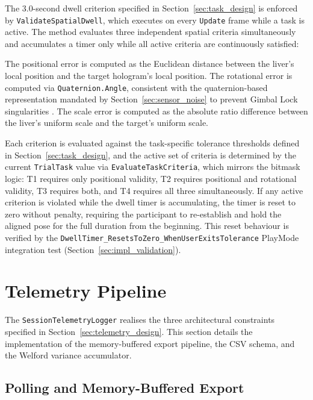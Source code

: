 The 3.0-second dwell criterion specified in Section~\ref{sec:task_design} is enforced by \texttt{ValidateSpatialDwell}, which executes on every \texttt{Update} frame while a task is active. The method evaluates three independent spatial criteria simultaneously and accumulates a timer only while all active criteria are continuously satisfied:

The positional error is computed as the Euclidean distance between the liver's local position and the target hologram's local position. The rotational error is computed via \texttt{Quaternion.Angle}, consistent with the quaternion-based representation mandated by Section~\ref{sec:sensor_noise} to prevent Gimbal Lock singularities \citep{Fang1998RealQuaternions}. The scale error is computed as the absolute ratio difference between the liver's uniform scale and the target's uniform scale.

Each criterion is evaluated against the task-specific tolerance thresholds defined in Section~\ref{sec:task_design}, and the active set of criteria is determined by the current \texttt{TrialTask} value via \texttt{EvaluateTaskCriteria}, which mirrors the bitmask logic: T1 requires only positional validity, T2 requires positional and rotational validity, T3 requires both, and T4 requires all three simultaneously. If any active criterion is violated while the dwell timer is accumulating, the timer is reset to zero without penalty, requiring the participant to re-establish and hold the aligned pose for the full duration from the beginning. This reset behaviour is verified by the \texttt{DwellTimer\_ResetsToZero\_WhenUserExitsTolerance} PlayMode integration test (Section~\ref{sec:impl_validation}).

\section{Telemetry Pipeline}
\label{sec:telemetry_impl}

The \texttt{SessionTelemetryLogger} realises the three architectural constraints specified in Section~\ref{sec:telemetry_design}. This section details the implementation of the memory-buffered export pipeline, the CSV schema, and the Welford variance accumulator.


\subsection{Polling and Memory-Buffered Export}
\label{sec:telemetry_pipeline_impl}

